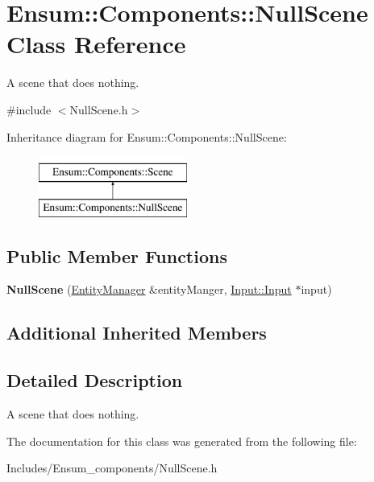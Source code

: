 \hypertarget{class_ensum_1_1_components_1_1_null_scene}{}\section{Ensum\+:\+:Components\+:\+:Null\+Scene Class Reference}
\label{class_ensum_1_1_components_1_1_null_scene}


A scene that does nothing.  




{\ttfamily \#include $<$Null\+Scene.\+h$>$}

Inheritance diagram for Ensum\+:\+:Components\+:\+:Null\+Scene\+:\begin{figure}[H]
\begin{center}
\leavevmode
\includegraphics[height=2.000000cm]{class_ensum_1_1_components_1_1_null_scene}
\end{center}
\end{figure}
\subsection*{Public Member Functions}
\begin{DoxyCompactItemize}
\item 
{\bfseries Null\+Scene} (\hyperlink{class_ensum_1_1_components_1_1_entity_manager}{Entity\+Manager} \&entity\+Manger, \hyperlink{class_ensum_1_1_input_1_1_input}{Input\+::\+Input} $\ast$input)\hypertarget{class_ensum_1_1_components_1_1_null_scene_a140c16207aa1450a50a78bd4030cffb4}{}\label{class_ensum_1_1_components_1_1_null_scene_a140c16207aa1450a50a78bd4030cffb4}

\end{DoxyCompactItemize}
\subsection*{Additional Inherited Members}


\subsection{Detailed Description}
A scene that does nothing. 

The documentation for this class was generated from the following file\+:\begin{DoxyCompactItemize}
\item 
Includes/\+Ensum\+\_\+components/Null\+Scene.\+h\end{DoxyCompactItemize}
